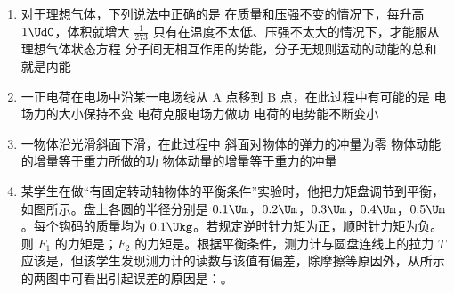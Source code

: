 \documentclass[\gkver]{gaokaozhenti}
\begin{document}
\begin{enumerate}

\item
对于理想气体，下列说法中正确的是
{在质量和压强不变的情况下，每升高 $1\UdC$，体积就增大 $\frac{1}{273}$}
{只有在温度不太低、压强不太大的情况下，才能服从理想气体状态方程}
{分子间无相互作用的势能，分子无规则运动的动能的总和就是内能}


\item
一正电荷在电场中沿某一电场线从 A 点移到 B 点，在此过程中有可能的是
\onepicture[w=5cm]{}
{电场力的大小保持不变}
{电荷克服电场力做功}
{电荷的电势能不断变小}


\item
一物体沿光滑斜面下滑，在此过程中
{斜面对物体的弹力的冲量为零}
{物体动能的增量等于重力所做的功}
{物体动量的增量等于重力的冲量}


\item
某学生在做“有固定转动轴物体的平衡条件”实验时，他把力矩盘调节到平衡，如图所示。盘上各圆的半径分别是 $0.1\Um$，$0.2\Um$，$0.3\Um$，$0.4\Um$，$0.5\Um$。每个钩码的质量均为 $0.1\Ukg$。若规定逆时针力矩为正，顺时针力矩为负。则 $F_{1}$ 的力矩是\tkanswer{$-0.12\Ukgf\cdot\Um$}；$F_{2}$ 的力矩是\tkanswer{$0.06\Ukgf\cdot\Um$}。根据平衡条件，测力计与圆盘连线上的拉力 $T$ 应该是\tkanswer{$0.3\Ukgf$}，但该学生发现测力计的读数与该值有偏差，除摩擦等原因外，从所示的两图中可看出引起误差的原因是：。


\end{enumerate}
\end{document}
